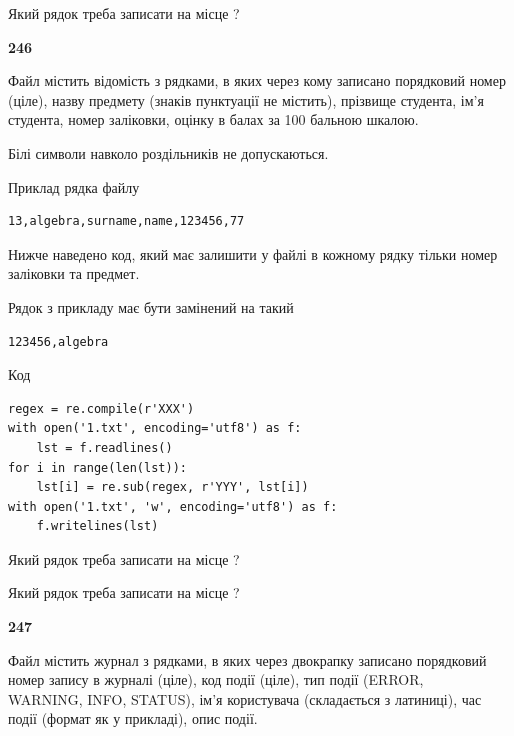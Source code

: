 Який рядок треба записати на місце  ?\par


\newpage

{\begin {center}\textbf{ 246}\end {center}}\par
Файл  містить відомість з рядками, в яких через кому записано поряд\-ковий номер (ціле), назву предмету (знаків пунктуації не містить), прізвище студента, ім'я студента, номер заліковки, оцінку в балах за 100 бальною шкалою.

Білі символи навколо роздільників не допускаються.

Приклад рядка файлу



\begin{verbatim}
13,algebra,surname,name,123456,77
\end{verbatim}


Нижче наведено код, який має залишити у файлі в кожному рядку тільки номер заліковки та предмет.

Рядок з прикладу має бути замінений на такий



\begin{verbatim}
123456,algebra
\end{verbatim}




Код



\begin{verbatim}
regex = re.compile(r'XXX')
with open('1.txt', encoding='utf8') as f:
    lst = f.readlines()
for i in range(len(lst)):
    lst[i] = re.sub(regex, r'YYY', lst[i])
with open('1.txt', 'w', encoding='utf8') as f:
    f.writelines(lst)
\end{verbatim}









Який рядок треба записати на місце  ?\par
\vspace{5mm}


Який рядок треба записати на місце  ?\par


\newpage

{\begin {center}\textbf{ 247}\end {center}}\par
Файл  містить журнал з рядками, в яких через двокрапку записано поряд\-ко\-вий номер запису в журналі (ціле), код події (ціле), тип події (ERROR, \\WARNING, INFO, STATUS), ім'я користувача (складається з латиниці), час події (фор\-мат як у прикладі), опис події.

